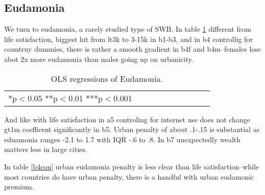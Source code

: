 \documentclass[10pt, letterpaper]{article}
\begin{document}
\begin{spacing}{1.4}
\subsection{Eudamonia}

We turn to eudamonia, a rarely studied type of SWB. 
 In table \ref{regB} different from life satisfaction, biggest hit from lt3k to 3-15k in b1-b3, and in b4
controllig for countruy dummies, there is rather a smooth gradient in b4f and
b4m--females lose  abot 2x more eudamonia than males going up on urbanicity.


\begin{table}[H]\centering\caption{OLS regressions of Eudamonia.} \label{regB} \begin{scriptsize} \begin{tabular}{p{1.6in}p{.5in}p{.5in}p{.5in}p{.5in}|p{.5in}p{.5in}|p{.5in}|p{.5in}p{.5in}p{.5 in}p{.5in}p{.5 in}}\hline  \hline\multicolumn{4}{l}{*p$<$0.05 **p$<$0.01 ***p$<$0.001} \end{tabular}\end{scriptsize}\end{table}

And like with life satisfaction in a5 controling for internet use does not change gt1m
coefficent significantly in b5.
Urban penalty of about .1-.15 is substantial as eduamonia ranges -2.1 to  1.7
with IQR -.6 to .8. In b7 unexpectedly wealth matters less in large cities. 


In table \ref{b4cou} urban eudamonia penalty is less clear than life
satisfaction--while most countries do have urban penalty, there is a handful
with urban eudamonic premium. 



\end{spacing}
\end{document}
